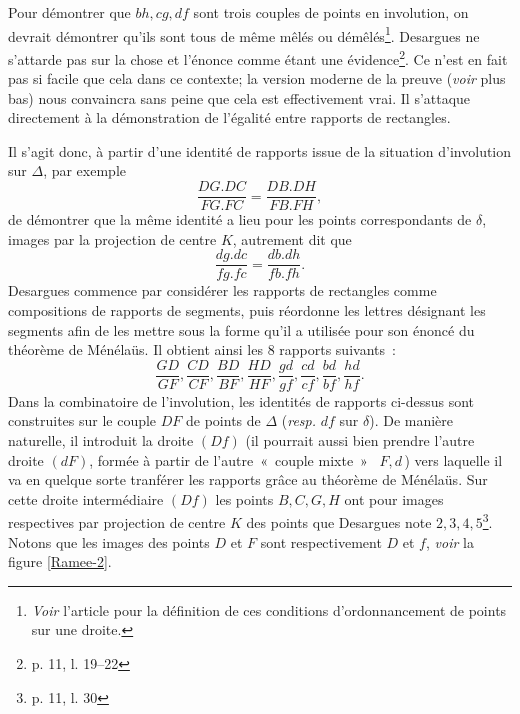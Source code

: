 \documentclass[12pt, a4paper]{article}
\begin{document}
Pour démontrer que $bh, cg, df$ sont trois couples de points en involution, on devrait démontrer qu'ils sont tous de même mêlés ou démêlés\footnote{\textit{Voir} l'article \cite{anglade-briend-1} pour la définition de ces conditions d'ordonnancement de points sur une droite.}. Desargues ne s'attarde pas sur la chose et l'énonce comme étant une évidence\footnote{p. 11, l. 19--22}. Ce n'est en fait pas si facile que cela dans ce contexte; la version moderne de la preuve ({\it voir} plus bas) nous convaincra sans peine que cela est effectivement vrai. Il s'attaque directement à la démonstration de l'égalité entre rapports de rectangles.

Il s'agit donc, à partir d'une identité de rapports issue de la situation d'involution sur $\Delta$, par exemple
\[
\frac{DG.DC}{FG.FC}=\frac{DB.DH}{FB.FH},
\]
de démontrer que la même identité a lieu pour les points correspondants de $\delta$, images par la projection de centre $K$, autrement dit que
\[
\frac{dg.dc}{fg.fc}=\frac{db.dh}{fb.fh}.
\]
Desargues commence par considérer les rapports de rectangles comme compositions de rapports de segments, puis réordonne les lettres désignant les segments afin de les mettre sous la forme qu'il a utilisée pour son énoncé du théorème de Ménélaüs. Il obtient ainsi les 8 rapports suivants~:~
\[
\frac{GD}{GF}, \frac{CD}{CF},\frac{BD}{BF}, \frac{HD}{HF}, \frac{gd}{gf}, \frac{cd}{cf},\frac{bd}{bf}, \frac{hd}{hf}.
\]
Dans la combinatoire de l'involution, les identités de rapports ci-dessus sont construites sur le couple $DF$ de points de $\Delta$ ({\it resp.} $df$ sur $\delta$).  De manière naturelle, il introduit la droite $(Df)$ (\/il pourrait aussi bien prendre l'autre droite $(dF)$, formée à partir de l'autre~«~couple mixte~»~ $F,d$\,) vers la\-quel\-le il va en quelque sorte tranférer les rapports grâce au théorème de Ménélaüs. Sur cette droite intermédiaire $(Df)$ les points $B,C,G,H$ ont pour images respectives par projection de centre $K$ des points que Desargues note $2,3,4,5$\footnote{p. 11, l. 30}. Notons que les images des points $D$ et $F$ sont respectivement $D$ et $f$, \textit{voir} la figure \ref{Ramee-2}.

\end{document}
